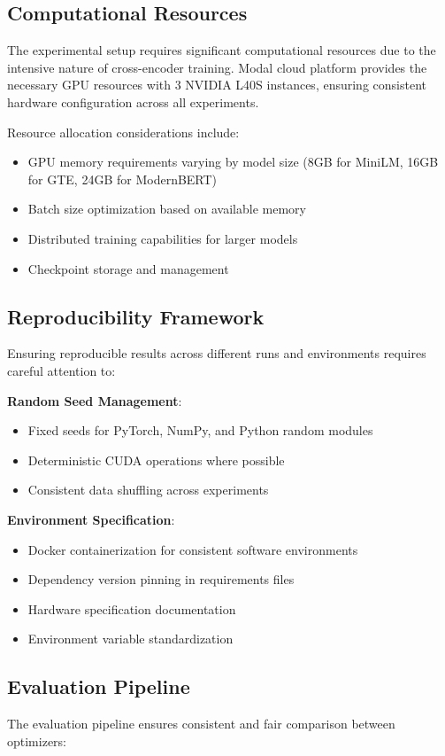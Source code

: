 \subsection{Computational Resources}
The experimental setup requires significant computational resources due to the intensive nature of cross-encoder training. Modal cloud platform provides the necessary GPU resources with 3 NVIDIA L40S instances, ensuring consistent hardware configuration across all experiments.

Resource allocation considerations include:
\begin{itemize}
    \item GPU memory requirements varying by model size (8GB for MiniLM, 16GB for GTE, 24GB for ModernBERT)
    \item Batch size optimization based on available memory
    \item Distributed training capabilities for larger models
    \item Checkpoint storage and management
\end{itemize}

\subsection{Reproducibility Framework}
Ensuring reproducible results across different runs and environments requires careful attention to:

\textbf{Random Seed Management}:
\begin{itemize}
    \item Fixed seeds for PyTorch, NumPy, and Python random modules
    \item Deterministic CUDA operations where possible
    \item Consistent data shuffling across experiments
\end{itemize}

\textbf{Environment Specification}:
\begin{itemize}
    \item Docker containerization for consistent software environments
    \item Dependency version pinning in requirements files
    \item Hardware specification documentation
    \item Environment variable standardization
\end{itemize}

\subsection{Evaluation Pipeline}
The evaluation pipeline ensures consistent and fair comparison between optimizers:

